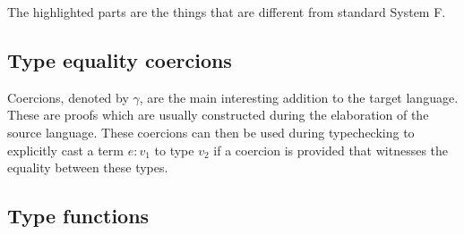 The highlighted parts are the things that are different from standard System F.

\subsection{Type equality coercions}

Coercions, denoted by $\gamma$, are the main interesting addition to the target
language. These are proofs which are usually constructed during the elaboration
of the source language. These coercions can then be used during typechecking to
explicitly cast a term $e : v_1$ to type $v_2$ if a coercion is provided that
witnesses the equality between these types.

\subsection{Type functions}


